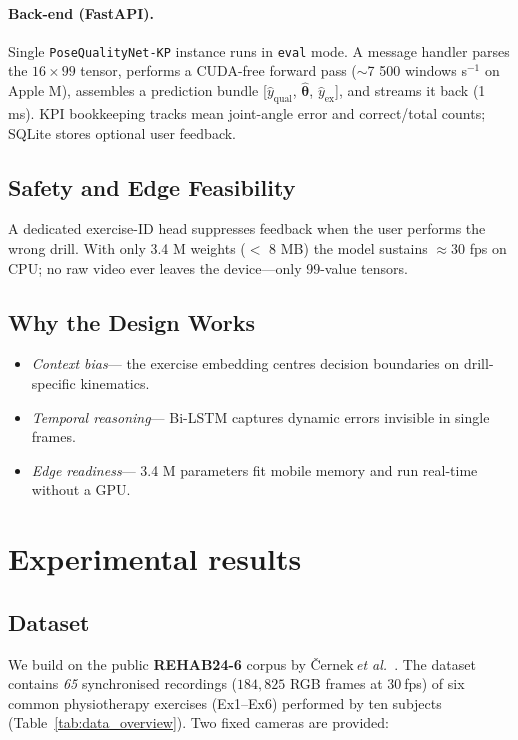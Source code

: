 \documentclass{article}
\begin{document}
\paragraph{Back-end (FastAPI).}
Single \texttt{PoseQualityNet-KP} instance runs in \texttt{eval} mode.
A message handler parses the $16{\times}99$ tensor, performs a
CUDA-free forward pass (${\sim}$7 500 windows s$^{-1}$ on Apple M),
assembles a prediction bundle
[$\hat y_{\text{qual}}$, $\hat{\boldsymbol\theta}$, $\hat y_{\text{ex}}$],
and streams it back (1 ms).  
KPI bookkeeping tracks mean joint-angle error and correct/total counts;
SQLite stores optional user feedback.

\subsection{Safety and Edge Feasibility}
A dedicated exercise-ID head suppresses feedback when the user performs
the wrong drill.  
With only 3.4 M weights ($<$ 8 MB) the model sustains $\approx$30 fps on
CPU; no raw video ever leaves the device—only 99-value tensors.

\subsection{Why the Design Works}
\begin{itemize}[leftmargin=1.35em]
  \item \emph{Context bias}\;— the exercise embedding centres decision
        boundaries on drill-specific kinematics.
  \item \emph{Temporal reasoning}\;— Bi-LSTM captures dynamic errors
        invisible in single frames.
  \item \emph{Edge readiness}\;— 3.4 M parameters fit mobile memory and
        run real-time without a GPU.
\end{itemize}


\section{Experimental results}

\subsection{Dataset}
\label{sec:data}

We build on the public \textbf{REHAB24-6} corpus by
Černek\,\textit{et al.}~\cite{cernek2024rehab}.  
The dataset contains \emph{65} synchronised recordings  
($184{,}825$ RGB frames at 30 fps) of six common physiotherapy
exercises (Ex1–Ex6) performed by ten subjects
(Table~\ref{tab:data_overview}).  
Two fixed cameras are provided:
\end{document}
